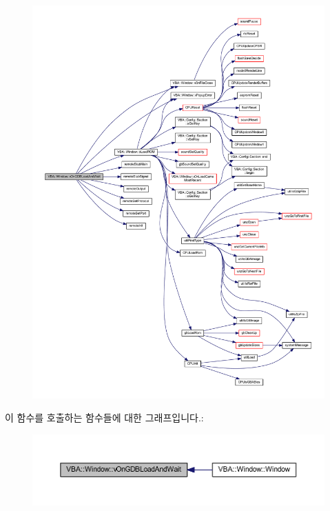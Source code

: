 \begin{figure}[H]
\begin{center}
\leavevmode
\includegraphics[width=350pt]{class_v_b_a_1_1_window_a266811d22fbeb400a01d1c2330fb9877_cgraph}
\end{center}
\end{figure}
이 함수를 호출하는 함수들에 대한 그래프입니다.\+:
\nopagebreak
\begin{figure}[H]
\begin{center}
\leavevmode
\includegraphics[width=350pt]{class_v_b_a_1_1_window_a266811d22fbeb400a01d1c2330fb9877_icgraph}
\end{center}
\end{figure}
\mbox{\label{class_v_b_a_1_1_window_a35c038f07a5ea91103c5e05b82b8bd0b}} 
